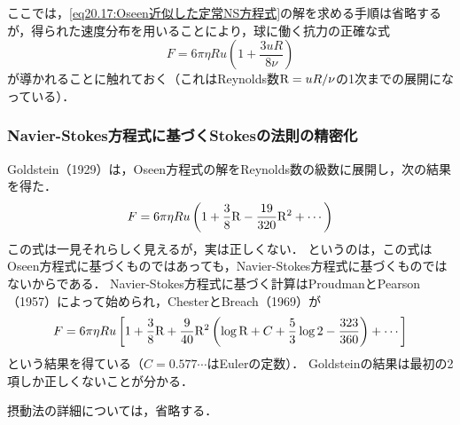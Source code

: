 ここでは，\eqref{eq20.17:Oseen近似した定常NS方程式}の解を求める手順は省略するが，得られた速度分布を用いることにより，球に働く抗力の正確な式
\begin{equation}\label{eq20.18:Stokesの法則の1次補正}
    F = 6\pi\eta Ru \left( 1 + \frac{3uR}{8\nu} \right)
\end{equation}
が導かれることに触れておく（これはReynolds数$\mathrm{R} = uR/\nu$の1次までの展開になっている）．





\subsubsection*{Navier-Stokes方程式に基づくStokesの法則の精密化}
Goldstein（1929）は，Oseen方程式の解をReynolds数の級数に展開し，次の結果を得た．
\[
    F =  6\pi\eta Ru \left( 1 + \frac{3}{8}\mathrm{R} - \frac{19}{320}\mathrm{R}^2 + \cdots \right)
\]
この式は一見それらしく見えるが，実は正しくない．
というのは，この式はOseen方程式に基づくものではあっても，Navier-Stokes方程式に基づくものではないからである．
Navier-Stokes方程式に基づく計算はProudmanとPearson（1957）によって始められ，ChesterとBreach（1969）が
\[
    F =  6\pi\eta Ru \left[ 1 + \frac{3}{8}\mathrm{R} + \frac{9}{40}\mathrm{R}^2 \left( \log \mathrm{R} + C + \frac{5}{3} \log 2 - \frac{323}{360} \right) + \cdots \right]
\]
という結果を得ている（$C=0.577\cdots$はEulerの定数）．
Goldsteinの結果は最初の2項しか正しくないことが分かる．



\begin{details}
摂動法の詳細については，省略する．
\end{details}







